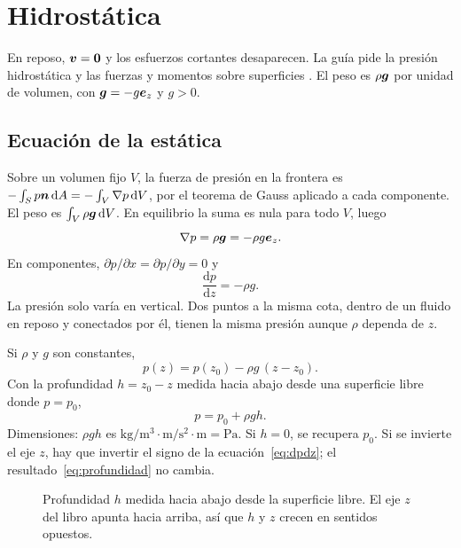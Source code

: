 \chapter{Hidrostática}
\label{ch:hidrostatica}

En reposo, \(\boldsymbol{v}=\boldsymbol{0}\) y los esfuerzos cortantes desaparecen. La guía pide la presión hidrostática y las fuerzas y momentos sobre superficies \parencite{uleGuia2026}. El peso es \(\rho\boldsymbol{g}\) por unidad de volumen, con \(\boldsymbol{g}=-g\boldsymbol{e}_z\) y \(g>0\).

\section{Ecuación de la estática}

Sobre un volumen fijo \(V\), la fuerza de presión en la frontera es \(-\int_S p\boldsymbol{n}\,\mathrm{d}A=-\int_V\nabla p\,\mathrm{d}V\), por el teorema de Gauss aplicado a cada componente. El peso es \(\int_V\rho\boldsymbol{g}\,\mathrm{d}V\). En equilibrio la suma es nula para todo \(V\), luego
\begin{equation}
\label{eq:hidrostatica}
\nabla p=\rho\boldsymbol{g}=-\rho g\boldsymbol{e}_z.
\end{equation}
En componentes, \(\partial p/\partial x=\partial p/\partial y=0\) y
\begin{equation}
\label{eq:dpdz}
\frac{\mathrm{d}p}{\mathrm{d}z}=-\rho g.
\end{equation}
 La presión solo varía en vertical. Dos puntos a la misma cota, dentro de un fluido en reposo y conectados por él, tienen la misma presión aunque \(\rho\) dependa de \(z\).

Si \(\rho\) y \(g\) son constantes,
\begin{equation}
\label{eq:hidro-lineal}
p(z)=p(z_0)-\rho g\,(z-z_0).
\end{equation}
Con la profundidad \(h=z_0-z\) medida hacia abajo desde una superficie libre donde \(p=p_0\),
\begin{equation}
\label{eq:profundidad}
p=p_0+\rho g h.
\end{equation}
Dimensiones: \(\rho g h\) es \(\si{\kilogram\per\cubic\metre}\cdot\si{\metre\per\second\squared}\cdot\si{\metre}=\si{\pascal}\). Si \(h=0\), se recupera \(p_0\). Si se invierte el eje \(z\), hay que invertir el signo de la ecuación~\eqref{eq:dpdz}; el resultado~\eqref{eq:profundidad} no cambia.

\begin{figure}[ht]
\centering
{}
\caption{Profundidad \(h\) medida hacia abajo desde la superficie libre. El eje \(z\) del libro apunta hacia arriba, así que \(h\) y \(z\) crecen en sentidos opuestos.}
\label{fig:hidrostatica}
\end{figure}

